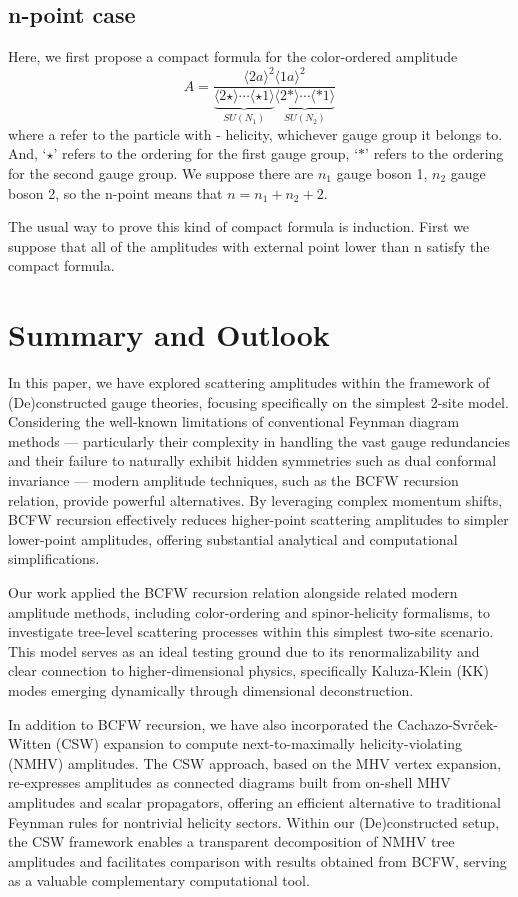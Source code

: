 \documentclass[12pt]{article}
\numberwithin{equation}{section}
\newcommand{\avg}[1]{\langle #1 \rangle}
\newcommand{\asqu}[1]{{\langle#1\rangle}^2}
\begin{document}
\subsection{n-point case}
Here, we first propose a compact formula for the color-ordered amplitude
\begin{equation}
    A=\frac{\asqu{2a}\!\asqu{1a}}{\underbrace{\avg{2\star}\cdots \avg{\star 1}}_{SU(N_1)}\underbrace{\avg{2\ast }\cdots \avg{\ast 1}}_{SU(N_2)}}
\end{equation}
where a refer to the particle with - helicity, whichever gauge group it belongs to. And, `$\star$' refers to the ordering for the first gauge group, `$\ast$'
refers to the ordering for the second gauge group. We suppose there are $n_1$ gauge boson 1, $n_2$ gauge boson 2, so the n-point means that $n=n_1+n_2+2$.
\par
The usual way to prove this kind of compact formula is induction. First we suppose that all of the amplitudes with external point lower than n satisfy the compact formula.


\section{Summary and Outlook}
In this paper, we have explored scattering amplitudes within the framework of (De)constructed gauge theories, focusing specifically on the simplest 2-site model. Considering the well-known limitations of conventional Feynman diagram methods — particularly their complexity in handling the vast gauge redundancies and their failure to naturally exhibit hidden symmetries such as dual conformal invariance — modern amplitude techniques, such as the BCFW recursion relation, provide powerful alternatives. By leveraging complex momentum shifts, BCFW recursion effectively reduces higher-point scattering amplitudes to simpler lower-point amplitudes, offering substantial analytical and computational simplifications.

Our work applied the BCFW recursion relation alongside related modern amplitude methods, including color-ordering and spinor-helicity formalisms, to investigate tree-level scattering processes within this simplest two-site scenario. This model serves as an ideal testing ground due to its renormalizability and clear connection to higher-dimensional physics, specifically Kaluza-Klein (KK) modes emerging dynamically through dimensional deconstruction.

In addition to BCFW recursion, we have also incorporated the Cachazo-Svrček-Witten (CSW) expansion to compute next-to-maximally helicity-violating (NMHV) amplitudes. The CSW approach, based on the MHV vertex expansion, re-expresses amplitudes as connected diagrams built from on-shell MHV amplitudes and scalar propagators, offering an efficient alternative to traditional Feynman rules for nontrivial helicity sectors. Within our (De)constructed setup, the CSW framework enables a transparent decomposition of NMHV tree amplitudes and facilitates comparison with results obtained from BCFW, serving as a valuable complementary computational tool.
\end{document}
